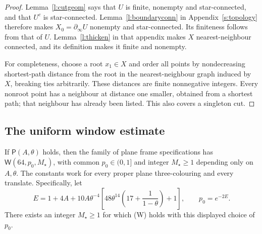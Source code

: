 \begin{proof}
Lemma~\ref{l:cutgeom} says that \(U\) is finite, nonempty and
star-connected, and that \(U^c\) is star-connected.
Lemma~\ref{l:boundaryconn} in Appendix~\ref{s:topology} therefore makes
\(X_0=\partial_\infty U\) nonempty and star-connected.
Its finiteness follows from that of \(U\).
Lemma~\ref{l:thicken} in that appendix makes \(X\) nearest-neighbour connected,
and its definition makes it finite and nonempty.

For completeness, choose a root \(x_1\in X\) and order all
points by nondecreasing shortest-path distance from the root
in the nearest-neighbour graph induced by \(X\), breaking
ties arbitrarily.  These distances are finite nonnegative
integers.  Every nonroot point has a neighbour at distance
one smaller, obtained from a shortest path; that neighbour
has already been listed.  This also covers a singleton cut.
\end{proof}

\subsection{The uniform window estimate}

\begin{theorem}\label{t:cutMOS}
If \(\mathsf P(A,\theta)\) holds, then the family of plane frame
specifications has \(\mathsf W(64,p_0,M_\star)\), with common
\(p_0\in(0,1]\) and integer \(M_\star\ge1\) depending only on
\(A,\theta\). The constants work for every proper plane
three-colouring and every translate.
Specifically, let
\[
 E=1+4A+10A\theta^{-4}
       \left[48\theta^{14}\left(17+\frac1{1-\theta}\right)+1\right],
 \qquad p_0=e^{-2E}.
\]
There exists an integer \(M_\star\ge1\) for which (W) holds
with this displayed choice of \(p_0\).
\end{theorem}

